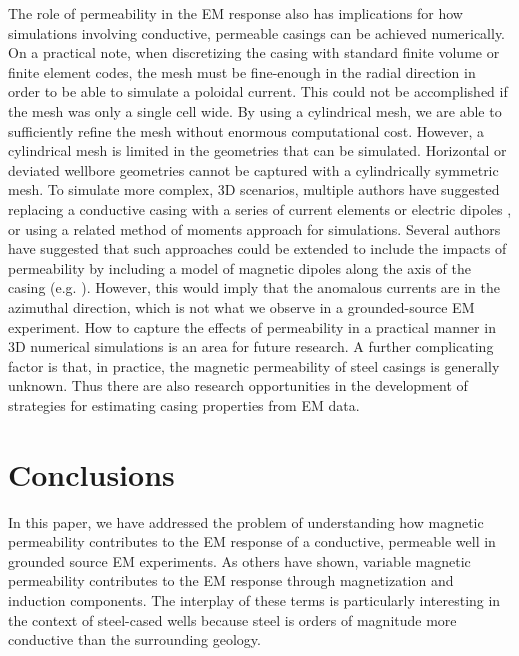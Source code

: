 \documentclass[onecolumn, extra, mreferee]{gji}
\begin{document}
The role of permeability in the EM response also has implications for how simulations involving conductive, permeable casings can be achieved numerically. On a practical note, when discretizing the casing with standard finite volume or finite element codes, the mesh must be fine-enough in the radial direction in order to be able to simulate a poloidal current. This could not be accomplished if the mesh was only a single cell wide. By using a cylindrical mesh, we are able to sufficiently refine the mesh without enormous computational cost. However, a cylindrical mesh is limited in the geometries that can be simulated. Horizontal or deviated wellbore geometries cannot be captured with a cylindrically symmetric mesh. To simulate more complex, 3D scenarios, multiple authors have suggested replacing a conductive casing with a series of current elements or electric dipoles \citep{cuevas_analytical_2014}, or using a related method of moments approach \citep{kohnke_method_2018, tang_three-dimensional_2015} for simulations. Several authors have suggested that such approaches could be extended to include the impacts of permeability by including a model of magnetic dipoles along the axis of the casing (e.g. \cite{patzer_steel-cased_2017, kohnke_method_2018}). However, this would imply that the anomalous currents are in the azimuthal direction, which is not what we observe in a grounded-source EM experiment. How to capture the effects of permeability in a practical manner in 3D numerical simulations is an area for future research. A further complicating factor is that, in practice, the magnetic permeability of steel casings is generally unknown. Thus there are also research opportunities in the development of strategies for estimating casing properties from EM data.

\section{Conclusions}
In this paper, we have addressed the problem of understanding how magnetic permeability contributes to the EM response of a conductive, permeable well in grounded source EM experiments. As others have shown, variable magnetic permeability contributes to the EM response through magnetization and induction components. The interplay of these terms is particularly interesting in the context of steel-cased wells because steel is orders of magnitude more conductive than the surrounding geology.
\end{document}

